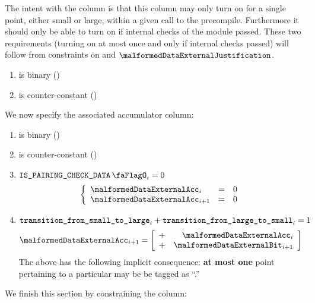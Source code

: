 The intent with the \malformedDataExternalBit{} column is that this column may only turn on for a single point, either small or large, within a given call to the  precompile. Furthermore it should only be able to turn on if internal checks of the module passed.
These two requirements (turning on at most once and only if internal checks passed) will follow from constraints on \malformedDataExternalAcc{} and $\malformedDataExternalJustification$.

\begin{enumerate}
    \item \malformedDataExternalBit{} is binary \quad (\trash)
    \item \malformedDataExternalBit{} is counter-constant \quad (\trash)
\end{enumerate}
We now specify the associated accumulator column:
\begin{enumerate}[resume]
    \item \malformedDataExternalAcc{} is binary \quad (\trash)
    \item \malformedDataExternalAcc{} is counter-constant \quad (\trash)
    \item \If $\isBlsPairingCheckData_{i} = 0$ \Then
          \[
              \left\{ \begin{array}{lcl}
                  \malformedDataExternalAcc _{i}     & = & 0 \\
                  \malformedDataExternalAcc _{i + 1} & = & 0 \\
              \end{array} \right.
          \]
    \item \If $\texttt{transition\_from\_small\_to\_large}_{i} + \texttt{transition\_from\_large\_to\_small}_{i} = 1$ \Then
          \[
              \malformedDataExternalAcc _{i + 1} =
              \left[ \begin{array}{cr}
                      + & \malformedDataExternalAcc _{i}     \\
                      + & \malformedDataExternalBit    _{i + 1} \\
                  \end{array} \right]
          \]
          \saNote{} The above has the following implicit consequence: \textbf{at most one} point pertaining to a particular \blsId{} may be be tagged as ``\malformedDataExternalBit.''
\end{enumerate}
We finish this section by constraining the \malformedDataExternalJustification{} column:
